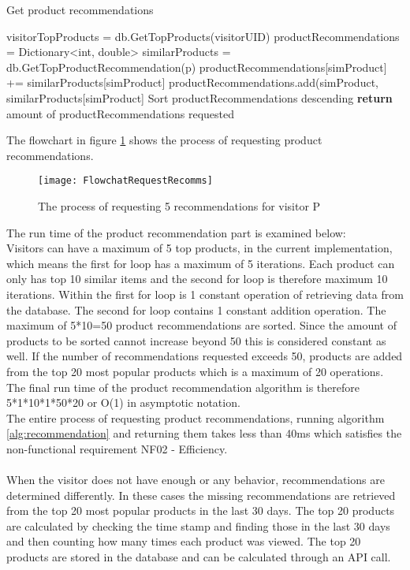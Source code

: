 \begin{algorithm}[H]
\caption{Get product recommendations}
\label{alg:recommendation}
\begin{algorithmic}[1]
\State visitorTopProducts = db.GetTopProducts(visitorUID)
\State productRecommendations = Dictionary<int, double>
\State similarProducts = db.GetTopProductRecommendation(p)
\State productRecommendations[simProduct] += similarProducts[simProduct]
\Else
\State productRecommendations.add(simProduct, similarProducts[simProduct]
\EndIf
\EndFor
\EndFor
\State Sort productRecommendations descending
\State \textbf{return} amount of productRecommendations requested
\State 
\end{algorithmic}
\end{algorithm}

The flowchart in figure \ref{flowchartRecomm} shows the process of requesting product recommendations.

\begin{figure}[H]
\centering
\texttt{[image: FlowchatRequestRecomms]}
\caption{The process of requesting 5 recommendations for visitor P}
\label{flowchartRecomm}
\end{figure}

The run time of the product recommendation part is examined below: \\
Visitors can have a maximum of 5 top products, in the current implementation, which means the first for loop has a maximum of 5 iterations. 
Each product can only has top 10 similar items and the second for loop is therefore maximum 10 iterations.
Within the first for loop is 1 constant operation of retrieving data from the database. The second for loop contains 1 constant addition operation.
The maximum of 5*10=50 product recommendations are sorted. Since the amount of products to be sorted cannot increase beyond 50 this is considered constant as well.
If the number of recommendations requested exceeds 50, products are added from the top 20 most popular products which is a maximum of 20 operations.
The final run time of the product recommendation algorithm is therefore 5*1*10*1*50*20 or O(1) in asymptotic notation. \\
The entire process of requesting product recommendations, running algorithm \ref{alg:recommendation} and returning them takes less than 40ms which satisfies the non-functional requirement NF02 - Efficiency. \\\\
When the visitor does not have enough or any behavior, recommendations are determined differently. In these cases the missing recommendations are retrieved from the top 20 most popular products in the last 30 days. The top 20 products are calculated by checking the time stamp and finding those in the last 30 days and then counting how many times each product was viewed. The top 20 products are stored in the database and can be calculated through an API call.

